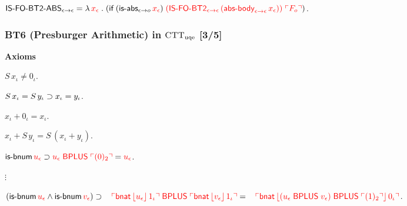 \documentclass[t,12pt,numbers,fleqn]{beamer}
\newcommand{\churchuqe}{$\mbox{\sc CTT}_{\rm uqe}$}
\newcommand{\syn}[1]{\textcolor{red}{#1}}
\begin{document}
\begin{frame}
    \setcounter{enumi}{6}

    \item $\mname{IS-FO-BT2-ABS}_{\epsilon \tarrow \epsilon} = {}\newline
    \LambdaApp \syn{x_\epsilon} \mdot 
    (\If \; (\mname{is-abs}_{\epsilon \tarrow o} \, \syn{x_\epsilon}) \;
    \syn{(\mname{IS-FO-BT2}_{\epsilon \tarrow \epsilon} \,
    (\mname{abs-body}_{\epsilon \tarrow \epsilon} \, x_\epsilon))} \;
    \syn{\synbrack{F_o}})$.

  \ee

\ei
\end{frame}


\begin{frame}
\frametitle{BT6 (Presburger Arithmetic) in {\churchuqe} [3/5]}
\small
\bi

  \item[] \textbf{Axioms}

  \be

    \item $S \, x_\iota \not= 0_\iota$.

    \item $S \, x_\iota = S \, y_\iota \supset x_\iota =
      y_\iota$.

    \item $x_\iota + 0_\iota = x_\iota$.

    \item $x_\iota + S \, y_\iota = S \, (x_\iota + y_\iota)$.

    \item $\mname{is-bnum} \, \syn{u_\epsilon} \Implies
      \syn{u_\epsilon \; \mname{BPLUS} \; \synbrack{(0)_2}} =
      \syn{u_\epsilon}$.

    \item[] $\vdots$

    \setcounter{enumi}{14}

    \item $(\mname{is-bnum} \, \syn{u_\epsilon} \Andd \mname{is-bnum}
      \, \syn{v_\epsilon}) \Implies {}\newline
        \hspace*{2ex} \syn{\synbrack{\mname{bnat} \,
            \commabrack{u_\epsilon} \, 1_\iota} \; \mname{BPLUS} \;
          \synbrack{\mname{bnat} \, \commabrack{v_\epsilon} \, 1_\iota}} = {}\newline
        \hspace*{2ex}\syn{\synbrack{\mname{bnat} \,
            \commabrack{(u_\epsilon \; \mname{BPLUS} \; v_\epsilon)
              \; \mname{BPLUS} \; \synbrack{(1)_2}} \, 0_\iota}}$.


\end{frame}
\end{document}
